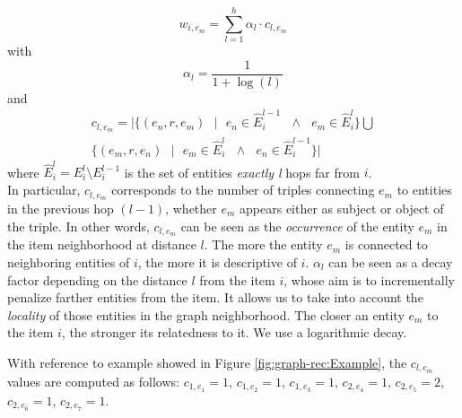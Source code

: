 \[
w_{i,e_m}=\sum \limits_{l=1}^{h} {\alpha_l \cdot c_{l,e_m}}
\] 
with 
\[
\alpha_l =\frac{1}{1+\log(l)}
\]
and
\begin{multline}
c_{l,e_m} = \vert \lbrace  (e_n,r,e_m) \textit{  } | \textit{  } e_n \in \widehat{E}^{l-1}_i \textit{ } \wedge \textit{ } e_m \in \widehat{E}^l_i \rbrace 
 \bigcup \\ \lbrace  (e_m,r,e_n) \textit{  } | \textit{  } e_m \in \widehat{E}^l_i  \textit{ } \wedge \textit{ }  e_n \in \widehat{E}^{l-1}_i \rbrace \vert \nonumber
\end{multline}
where $ \widehat{E}^l_i =  E^l_i \setminus E^{l-1}_i$ is the set of entities \textit{exactly l} hops far from $i$. 
\\In particular, $c_{l,e_m}$ corresponds to the number of triples connecting $e_m$ to entities in the previous hop \textit{$(l-1)$}, whether $e_m$ appears either as subject or object of the triple. In other words, $c_{l,e_m}$ can be seen as the \textit{occurrence} of the entity $e_m$ in the item neighborhood at distance $l$. 
The more the entity $e_m$ is connected to neighboring entities of $i$, the more it is descriptive of $i$. 
$\alpha_l$ can be seen as a decay factor depending on the distance $l$ from the item $i$, whose aim is to incrementally penalize farther entities from the item. It allows us to take into account the \textit{locality} of those entities in the graph neighborhood. The closer an entity $e_m$ to the item $i$, the stronger its relatedness to it. We use a logarithmic decay. 

With reference to example showed in Figure \ref{fig:graph-rec:Example}, the $c_{l,e_m}$ values are computed as follows: 
$c_{1,e_1} =1$, $c_{1,e_2} =1$, $c_{1,e_3} = 1$, $c_{2,e_4} = 1$, $c_{2,e_5} =2$, $c_{2,e_6} =1$, $c_{2,e_7} =1$.%

